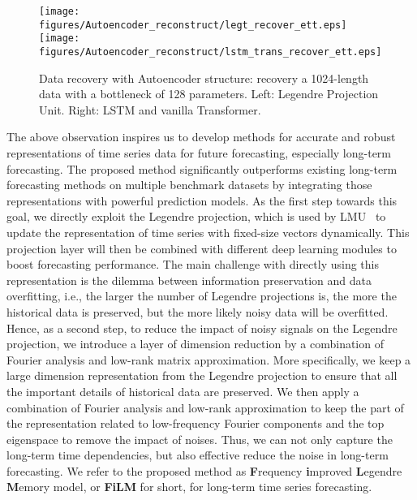 \documentclass{article}
\begin{document}
\begin{wrapfigure}[12]{r}{0.7\textwidth}
\vskip -0.22in
\centering
\texttt{[image: figures/Autoencoder\_reconstruct/legt\_recover\_ett.eps]}
\texttt{[image: figures/Autoencoder\_reconstruct/lstm\_trans\_recover\_ett.eps]}
\vskip -0.1in
\caption{Data recovery with Autoencoder structure: recovery a 1024-length data with a bottleneck of 128 parameters. Left: Legendre Projection Unit. Right: LSTM and vanilla Transformer.}
\label{fig:recover}
\vskip -0.20in
\end{wrapfigure}







The above observation inspires us to develop methods for accurate and robust representations of time series data for future forecasting, especially long-term forecasting. The proposed method significantly outperforms existing long-term forecasting methods on multiple benchmark datasets by integrating those representations with powerful prediction models. As the first step towards this goal, we directly exploit the Legendre projection, which is used by LMU~\cite{LMU} to update the representation of time series with fixed-size vectors dynamically. This projection layer will then be combined with different deep learning modules to boost forecasting performance. The main challenge with directly using this representation is the dilemma between information preservation and data overfitting, i.e., the larger the number of Legendre projections is, the more the historical data is preserved, but the more likely noisy data will be overfitted. Hence, as a second step, to reduce the impact of noisy signals on the Legendre projection, we introduce a layer of dimension reduction by a combination of Fourier analysis and low-rank matrix approximation. More specifically, we keep a large dimension representation from the Legendre projection to ensure that all the important details of historical data are preserved. We then apply a combination of Fourier analysis and low-rank approximation to keep the part of the representation related to low-frequency Fourier components and the top eigenspace to remove the impact of noises. Thus, we can not only capture the long-term time dependencies, but also effective reduce the noise in long-term forecasting. We refer to the proposed method as \textbf{F}requency \textbf{i}mproved
\textbf{L}egendre
\textbf{M}emory model, or \textbf{FiLM} for short, for long-term time series forecasting. 
 
\end{document}
